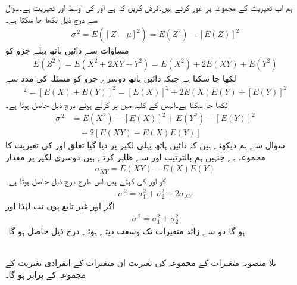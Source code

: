 ہم اب تغیریت کے مجموعہ پر غور کرتے ہیں۔فرض کریں کہ  ہے اور  کی اوسط  اور تغیریت  ہے۔سوال  سے درج ذیل لکھا جا سکتا ہے۔
\begin{align*}
\sigma^{\,2}=E([Z-\mu]^2)=E(Z^2)-[E(Z)]^2
\end{align*}
مساوات  سے  دائیں ہاتھ پہلے جزو کو
\begin{align*}
E(Z^2)=E(X^2+2XY+Y^2)=E(X^2)+2E(XY)+E(Y^2)
\end{align*}
لکھا جا سکتا ہے جبکہ دائیں ہاتھ دوسرے جزو کو مسئلہ  کی مدد سے
\begin{align*}
[E(Z)]^2=[E(X)+E(Y)]^2=[E(X)]^2+2E(X)E(Y)+[E(Y)]^2
\end{align*}
لکھا جا سکتا ہے۔انہیں  کے کلیہ میں پر کرتے ہوئے درج ذیل حاصل ہوتا ہے۔
\begin{align*}
\sigma^{\,2}&=E(X^2)-[E(X)]^2+E(Y^2)-[E(Y)]^2\\
&\quad +2[E(XY)-E(X)E(Y)]
\end{align*}
سوال  سے ہم دیکھتے ہیں کہ دائیں ہاتھ پہلی لکیر پر دیا گیا تعلق  اور  کی تغیریت کا مجموعہ ہے  جنہیں ہم  بالترتیب  اور  سے ظاہر کرتے ہیں۔دوسری لکیر پر مقدار
\begin{align}
\sigma_{XY}=E(XY)-E(X)E(Y)
\end{align}
کو  اور  کی  کہتے ہیں۔اس طرح درج ذیل حاصل ہوتا ہے۔
\begin{align}
\sigma^{\,2}=\sigma_1^2+\sigma_2^2+2\sigma_{XY}
\end{align}
اگر  اور  غیر تابع ہوں تب  لہٰذا   اور
\begin{align}
\sigma^{\,2}=\sigma_1^2+\sigma_2^2
\end{align}
ہو گا۔دو سے زائد متغیرات تک وسعت دیتے ہوئے درج ذیل حاصل ہو گا۔

\quad {}\\
 بلا منصوبہ متغیرات کے مجموعہ کی تغیریت ان متغیرات کے انفرادی تغیریت کے مجموعہ کے برابر ہو گا۔


